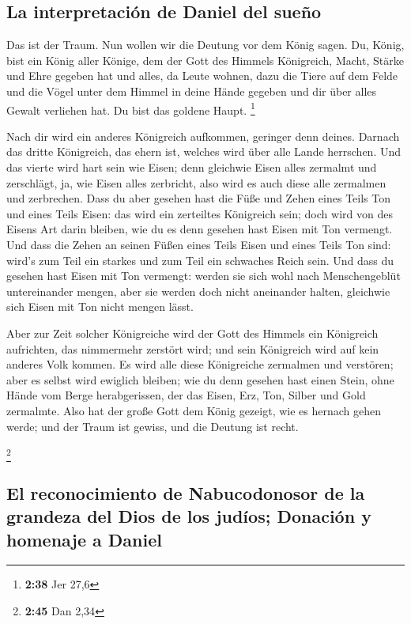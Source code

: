 \hypertarget{la-interpretaciuxf3n-de-daniel-del-sueuxf1o}{%
\subsection{La interpretación de Daniel del
sueño}\label{la-interpretaciuxf3n-de-daniel-del-sueuxf1o}}

 Das ist der Traum. Nun wollen wir die Deutung vor dem
König sagen.  Du, König, bist ein König aller Könige, dem
der Gott des Himmels Königreich, Macht, Stärke und Ehre gegeben hat
 und alles, da Leute wohnen, dazu die Tiere auf dem Felde
und die Vögel unter dem Himmel in deine Hände gegeben und dir über alles
Gewalt verliehen hat. Du bist das goldene Haupt. \footnote{\textbf{2:38}
  Jer 27,6}

 Nach dir wird ein anderes Königreich aufkommen, geringer
denn deines. Darnach das dritte Königreich, das ehern ist, welches wird
über alle Lande herrschen.  Und das vierte wird hart sein
wie Eisen; denn gleichwie Eisen alles zermalmt und zerschlägt, ja, wie
Eisen alles zerbricht, also wird es auch diese alle zermalmen und
zerbrechen.  Dass du aber gesehen hast die Füße und Zehen
eines Teils Ton und eines Teils Eisen: das wird ein zerteiltes
Königreich sein; doch wird von des Eisens Art darin bleiben, wie du es
denn gesehen hast Eisen mit Ton vermengt.  Und dass die
Zehen an seinen Füßen eines Teils Eisen und eines Teils Ton sind: wird's
zum Teil ein starkes und zum Teil ein schwaches Reich sein.
 Und dass du gesehen hast Eisen mit Ton vermengt: werden
sie sich wohl nach Menschengeblüt untereinander mengen, aber sie werden
doch nicht aneinander halten, gleichwie sich Eisen mit Ton nicht mengen
lässt.

 Aber zur Zeit solcher Königreiche wird der Gott des
Himmels ein Königreich aufrichten, das nimmermehr zerstört wird; und
sein Königreich wird auf kein anderes Volk kommen. Es wird alle diese
Königreiche zermalmen und verstören; aber es selbst wird ewiglich
bleiben;  wie du denn gesehen hast einen Stein, ohne
Hände vom Berge herabgerissen, der das Eisen, Erz, Ton, Silber und Gold
zermalmte. Also hat der große Gott dem König gezeigt, wie es hernach
gehen werde; und der Traum ist gewiss, und die Deutung ist recht.

\footnote{\textbf{2:45} Dan 2,34}

\hypertarget{el-reconocimiento-de-nabucodonosor-de-la-grandeza-del-dios-de-los-juduxedos-donaciuxf3n-y-homenaje-a-daniel}{%
\subsection{El reconocimiento de Nabucodonosor de la grandeza del Dios
de los judíos; Donación y homenaje a
Daniel}\label{el-reconocimiento-de-nabucodonosor-de-la-grandeza-del-dios-de-los-juduxedos-donaciuxf3n-y-homenaje-a-daniel}}

